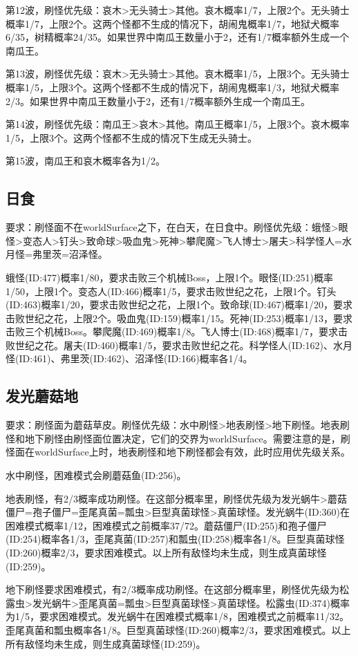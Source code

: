 第12波，刷怪优先级：哀木>无头骑士>其他。哀木概率1/7，上限2个。无头骑士概率1/7，上限2个。这两个怪都不生成的情况下，胡闹鬼概率1/7，地狱犬概率6/35，树精概率24/35。如果世界中南瓜王数量小于2，还有1/7概率额外生成一个南瓜王。

第13波，刷怪优先级：哀木>无头骑士>其他。哀木概率1/5，上限3个。无头骑士概率1/5，上限3个。这两个怪都不生成的情况下，胡闹鬼概率1/3，地狱犬概率2/3。如果世界中南瓜王数量小于2，还有1/7概率额外生成一个南瓜王。

第14波，刷怪优先级：南瓜王>哀木>其他。南瓜王概率1/5，上限3个。哀木概率1/5，上限3个。这两个怪都不生成的情况下生成无头骑士。

第15波，南瓜王和哀木概率各为1/2。

\subsection{日食}
要求：刷怪面不在worldSurface之下，在白天，在日食中。刷怪优先级：蛾怪>眼怪>变态人>钉头>致命球>吸血鬼>死神>攀爬魔>飞人博士>屠夫>科学怪人=水月怪=弗里茨=沼泽怪。

蛾怪(ID:477)概率1/80，要求击败三个机械Boss，上限1个。眼怪(ID:251)概率1/50，上限1个。变态人(ID:466)概率1/5，要求击败世纪之花，上限1个。钉头(ID:463)概率1/20，要求击败世纪之花，上限1个。致命球(ID:467)概率1/20，要求击败世纪之花，上限2个。吸血鬼(ID:159)概率1/15。死神(ID:253)概率1/13，要求击败三个机械Boss。攀爬魔(ID:469)概率1/8。飞人博士(ID:468)概率1/7，要求击败世纪之花。屠夫(ID:460)概率1/5，要求击败世纪之花。科学怪人(ID:162)、水月怪(ID:461)、弗里茨(ID:462)、沼泽怪(ID:166)概率各1/4。

\subsection{发光蘑菇地}
要求：刷怪面为蘑菇草皮。刷怪优先级：水中刷怪>地表刷怪>地下刷怪。地表刷怪和地下刷怪由刷怪面位置决定，它们的交界为worldSurface。需要注意的是，刷怪面在worldSurface上时，地表刷怪和地下刷怪都会有效，此时应用优先级关系。

水中刷怪，困难模式会刷蘑菇鱼(ID:256)。

地表刷怪，有2/3概率成功刷怪。在这部分概率里，刷怪优先级为发光蜗牛>蘑菇僵尸=孢子僵尸=歪尾真菌=瓢虫>巨型真菌球怪>真菌球怪。发光蜗牛(ID:360)在困难模式概率1/12，困难模式之前概率37/72。蘑菇僵尸(ID:255)和孢子僵尸(ID:254)概率各1/3，歪尾真菌(ID:257)和瓢虫(ID:258)概率各1/8。巨型真菌球怪(ID:260)概率2/3，要求困难模式。以上所有敌怪均未生成，则生成真菌球怪(ID:259)。

地下刷怪要求困难模式，有2/3概率成功刷怪。在这部分概率里，刷怪优先级为松露虫>发光蜗牛>歪尾真菌=瓢虫>巨型真菌球怪>真菌球怪。松露虫(ID:374)概率为1/5，要求困难模式。发光蜗牛在困难模式概率1/8，困难模式之前概率11/32。歪尾真菌和瓢虫概率各1/8。巨型真菌球怪(ID:260)概率2/3，要求困难模式。以上所有敌怪均未生成，则生成真菌球怪(ID:259)。


